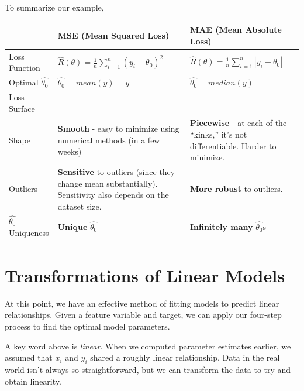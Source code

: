 \documentclass[
  letterpaper,
  DIV=11,
  numbers=noendperiod]{scrreprt}
\begin{document}
To summarize our example,

\begin{longtable}[]{@{}
  >{\raggedright\arraybackslash}p{}
  >{\raggedright\arraybackslash}p{}
  >{\raggedright\arraybackslash}p{}@{}}
\toprule\noalign{}
\begin{minipage}[b]{\linewidth}\raggedright
\end{minipage} & \begin{minipage}[b]{\linewidth}\raggedright
MSE (Mean Squared Loss)
\end{minipage} & \begin{minipage}[b]{\linewidth}\raggedright
MAE (Mean Absolute Loss)
\end{minipage} \\
\midrule\noalign{}
\endhead
\bottomrule\noalign{}
\endlastfoot
Loss Function &
\(\hat{R}(\theta) = \frac{1}{n}\sum^{n}_{i=1} (y_i - \theta_0)^2\) &
\(\hat{R}(\theta) = \frac{1}{n}\sum^{n}_{i=1} |y_i - \theta_0|\) \\
Optimal \(\hat{\theta_0}\) & \(\hat{\theta_0} = mean(y) = \bar{y}\) &
\(\hat{\theta_0} = median(y)\) \\
Loss Surface & & \\
Shape & \textbf{Smooth} - easy to minimize using numerical methods (in a
few weeks) & \textbf{Piecewise} - at each of the ``kinks,'' it's not
differentiable. Harder to minimize. \\
Outliers & \textbf{Sensitive} to outliers (since they change mean
substantially). Sensitivity also depends on the dataset size. &
\textbf{More robust} to outliers. \\
\(\hat{\theta_0}\) Uniqueness & \textbf{Unique} \(\hat{\theta_0}\) &
\textbf{Infinitely many} \(\hat{\theta_0}\)s \\
\end{longtable}

\section{Transformations of Linear
Models}\label{transformations-of-linear-models}

At this point, we have an effective method of fitting models to predict
linear relationships. Given a feature variable and target, we can apply
our four-step process to find the optimal model parameters.

A key word above is \emph{linear}. When we computed parameter estimates
earlier, we assumed that \(x_i\) and \(y_i\) shared a roughly linear
relationship. Data in the real world isn't always so straightforward,
but we can transform the data to try and obtain linearity.
\end{document}
